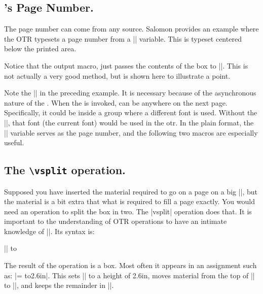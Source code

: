 \begin{teXXX}
If the file is not included, reset \deadcycles, so that a long list of non-included
files does not generate an `Output loop' error.
115 \deadcycles{} %
117  \let\@auxout\@mainaux}
\end{teXXX}


\subsection{\tex's Page Number.} The page number can come from any source. Salomon provides an example where the \textsc{OTR} typesets a page number from a |\count| variable. This is typeset centered below the printed area.


Notice that the output macro, just passes the contents of the box to |\shipout|. This is not actually a very good method, but is shown here to illustrate a point.

Note the |\tenrm| in the preceding example. It
is necessary because of the asynchronous nature of
the \otr. When the \otr is invoked, \tex can be
anywhere on the next page. Specifically, it could
be inside a group where a different font is used.
Without the |\tenrm|, that font (the current font)
would be used in the otr.
In the plain format, the || variable
serves as the page number, and the following two
macros are especially useful.




\subsection{The \texttt{\textbackslash vsplit} operation.} 

Supposed you have inserted the material required to go on a page on a big |\vbox|, but the material is a bit extra that what is required to fill a page exactly. You would need an operation to split the box in two. The |vsplit| operation does that. It is important to the understanding of OTR operations to have an intimate knowledge of |\vsplit|. Its syntax is: 

|\vsplit| to 

The result of the operation is a box. Most often it appears in an assignment such as: |= to2.6in|. This sets || to a
height of 2.6in, moves material from the top of
|| to ||, and keeps the remainder in ||.

